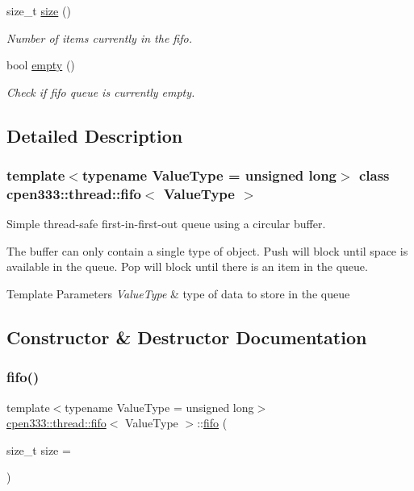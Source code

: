 \begin{DoxyCompactItemize}
size\+\_\+t \hyperlink{classcpen333_1_1thread_1_1fifo_a9cb822d2b108ebf092146dbe2cd90f1f}{size} ()
\begin{DoxyCompactList}\small\item\em Number of items currently in the fifo. \end{DoxyCompactList}\item 
bool \hyperlink{classcpen333_1_1thread_1_1fifo_aa624c7eefa407c9a69ca55504c377b18}{empty} ()
\begin{DoxyCompactList}\small\item\em Check if fifo queue is currently empty. \end{DoxyCompactList}\end{DoxyCompactItemize}


\subsection{Detailed Description}
\subsubsection*{template$<$typename Value\+Type = unsigned long$>$\newline
class cpen333\+::thread\+::fifo$<$ Value\+Type $>$}

Simple thread-\/safe first-\/in-\/first-\/out queue using a circular buffer. 

The buffer can only contain a single type of object. Push will block until space is available in the queue. Pop will block until there is an item in the queue.


\begin{DoxyTemplParams}{Template Parameters}
{\em Value\+Type} & type of data to store in the queue \\
\hline
\end{DoxyTemplParams}


\subsection{Constructor \& Destructor Documentation}
\mbox{\label{classcpen333_1_1thread_1_1fifo_a472cd6f1727d27179fc6c2b1067145fb}} 
\subsubsection{\texorpdfstring{fifo()}{fifo()}}
{\footnotesize\ttfamily template$<$typename Value\+Type  = unsigned long$>$ \\
\hyperlink{classcpen333_1_1thread_1_1fifo}{cpen333\+::thread\+::fifo}$<$ Value\+Type $>$\+::\hyperlink{classcpen333_1_1thread_1_1fifo}{fifo} (\begin{DoxyParamCaption}\item[{size\+\_\+t}]{size = {} }\end{DoxyParamCaption})\hspace{0.3cm}{\ttfamily [inline]}}



